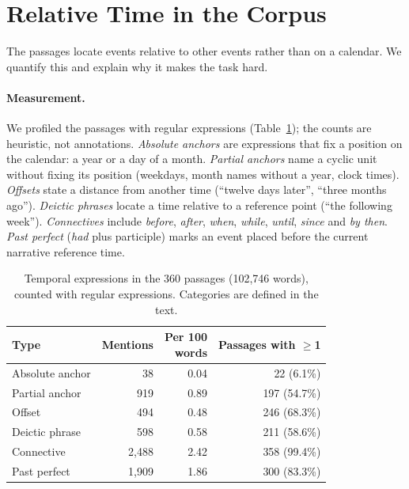 \documentclass[11pt]{article}
\begin{document}
\section{Relative Time in the Corpus}
\label{app:relative}

The passages locate events relative to other events rather than on a calendar. We quantify this and explain why it makes the task hard.

\paragraph{Measurement.}
We profiled the passages with regular expressions (Table~\ref{tab:relative}); the counts are heuristic, not annotations. \emph{Absolute anchors} are expressions that fix a position on the calendar: a year or a day of a month. \emph{Partial anchors} name a cyclic unit without fixing its position (weekdays, month names without a year, clock times). \emph{Offsets} state a distance from another time (``twelve days later'', ``three months ago''). \emph{Deictic phrases} locate a time relative to a reference point (``the following week''). \emph{Connectives} include \emph{before}, \emph{after}, \emph{when}, \emph{while}, \emph{until}, \emph{since} and \emph{by then}. \emph{Past perfect} (\emph{had} plus participle) marks an event placed before the current narrative reference time.

\begin{table}[!ht]
\centering
\small
\setlength{\tabcolsep}{4pt}
\begin{tabular}{l r r r}
\toprule
Type & Mentions & \makecell{Per 100\\words} & \makecell{Passages\\with $\geq$1} \\
\midrule
Absolute anchor & 38 & 0.04 & 22 (6.1\%) \\
Partial anchor & 919 & 0.89 & 197 (54.7\%) \\
Offset & 494 & 0.48 & 246 (68.3\%) \\
Deictic phrase & 598 & 0.58 & 211 (58.6\%) \\
Connective & 2,488 & 2.42 & 358 (99.4\%) \\
Past perfect & 1,909 & 1.86 & 300 (83.3\%) \\
\bottomrule
\end{tabular}
\caption{Temporal expressions in the 360 passages (102,746 words), counted with regular expressions. Categories are defined in the text.}
\label{tab:relative}
\end{table}
\end{document}
